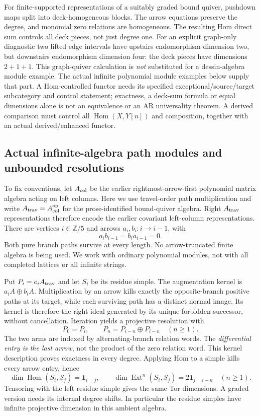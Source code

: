 \documentclass[11pt]{article}
\theoremstyle{definition}\newtheorem{definition}[theorem]{Definition}
\theoremstyle{remark}\newtheorem{remark}[theorem]{Remark}
\begin{document}
For finite-supported representations of a suitably graded bound quiver,
pushdown maps split into deck-homogeneous blocks. The arrow equations
preserve the degree, and monomial zero relations are homogeneous. The
resulting Hom direct sum controls all deck pieces, not just degree one.
For an explicit graph-only diagnostic two lifted edge intervals have
upstairs endomorphism dimension two, but downstairs endomorphism dimension
four: the deck pieces have dimensions $2+1+1$. This graph-quiver calculation
is \emph{not} substituted for a dessin-algebra module example.
The actual infinite polynomial module examples below supply that part.
A Hom-controlled functor needs its specified exceptional/source/target
subcategory and control statement; exactness, a deck-sum formula or equal
dimensions alone is not an equivalence or an AR universality theorem.
A derived comparison must control all $\operatorname{Hom}(X,Y[n])$ and
composition, together with an actual derived/enhanced functor.

\subsection{Actual infinite-algebra path modules and unbounded resolutions}
To fix conventions, let $A_{\rm col}$ be the earlier rightmost-arrow-first
polynomial matrix algebra acting on left columns. Here we use travel-order
path multiplication and write $A_{\rm trav}=A_{\rm col}^{\rm op}$ for the
prose-identified bound-quiver algebra. Right $A_{\rm trav}$ representations
therefore encode the earlier covariant left-column representations.
There are vertices $i\in\mathbb Z/5$ and arrows $a_i,b_i:i\to i-1$, with
\[
 a_ib_{i-1}=b_ia_{i-1}=0.
\]
Both pure branch paths survive at every length. No arrow-truncated finite
algebra is being used. We work with ordinary polynomial modules, not with
all completed lattices or all infinite strings.

Put $P_i=e_iA_{\rm trav}$ and let $S_i$ be its residue simple.
The augmentation kernel is $a_iA\oplus b_iA$. Multiplication by an arrow
kills exactly the opposite-branch positive paths at its target, while each
surviving path has a distinct normal image. Its kernel is therefore the
right ideal generated by its unique forbidden successor, without cancellation.
Iteration yields a projective resolution with
\[
 P_0=P_i,\qquad P_n=P_{i-n}\oplus P_{i-n}\quad(n\geq1).
\]
The two arms are indexed by alternating-branch relation words. The
\emph{differential entry is the last arrow}, not the product of the zero
relation word. This kernel description proves exactness in every degree.
Applying Hom to a simple kills every arrow entry, hence
\[
 \dim\operatorname{Hom}(S_i,S_j)=\mathbf1_{i=j},\qquad
 \dim\operatorname{Ext}^n(S_i,S_j)=2\mathbf1_{j=i-n}\quad(n\geq1).
\]
Tensoring with the left residue simple gives the same Tor dimensions.
A graded version needs its internal degree shifts. In particular the
residue simples have infinite projective dimension in this ambient algebra.
\end{document}
